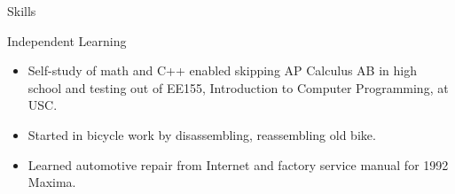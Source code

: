 \documentclass[11pt, letterpaper]{article}
\begin{document}
\begin{cv}{\color{blue}{Eric A. Cioffi}}
\begin{cvlist}{Skills}
    \setlength{\itemsep}{-0.25em} %
    \item[Independent Learning]
    \begin{itemize}[topsep=-0.5em, itemindent=0em, labelsep=0.5em, leftmargin=1em, itemsep=0em]
        \small
        \item Self-study of math and C++ enabled skipping AP Calculus AB in high school and testing out of EE155, Introduction to Computer Programming, at USC.
        \item Started in bicycle work by disassembling, reassembling old bike.
	    \item Learned automotive repair from Internet and factory service manual for 1992 Maxima.
    \end{itemize}
    
\end{cvlist}

\end{cv}
\end{document}
